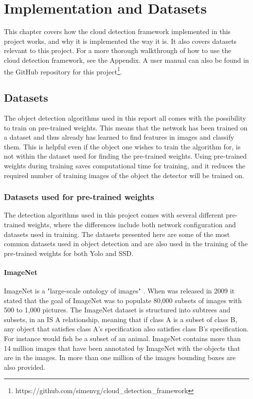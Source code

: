 
\chapter{Implementation and Datasets}

This chapter covers how the cloud detection framework implemented in this project works, and why it is implemented the way it is. It also covers datasets relevant to this project. For a more thorough walkthrough of how to use the cloud detection framework, see the Appendix. A user manual can also be found in the GitHub repository for this project\footnote{https://github.com/simenvg/cloud\_detection\_framework}. 

\section{Datasets}
The object detection algorithms used in this report all comes with the possibility to train on pre-trained weights. This means that the network has been trained on a dataset and thus already has learned to find features in images and classify them. This is helpful even if the object one wishes to train the algorithm for, is not within the dataset used for finding the pre-trained weights. Using pre-trained weights during training saves computational time for training, and it reduces the required number of training images of the object the detector will be trained on.

\vspace{3mm}

\subsection{Datasets used for pre-trained weights}
The detection algorithms used in this project comes with several different pre-trained weights, where the differences include both network configuration and datasets used in training. The datasets presented here are some of the most common datasets used in object detection and are also used in the training of the pre-trained weights for both Yolo and SSD.


\subsubsection{ImageNet}
ImageNet is a "large-scale ontology of images" \citep{Deng2009}. When \citep{Deng2009} was released in 2009 it stated that the goal of ImageNet was to populate 80,000 subsets of images with 500 to 1,000 pictures. The ImageNet dataset is structured into subtrees and subsets, in an IS A relationship, meaning that if class A is a subset of class B, any object that satisfies class A's specification also satisfies class B's specification. For instance would fish be a subset of an animal. ImageNet contains more than 14 million images that have been annotated by ImageNet with the objects that are in the images. In more than one million of the images bounding boxes are also provided. 


